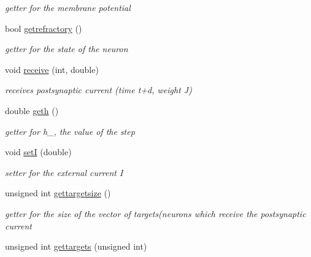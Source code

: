 \begin{DoxyCompactItemize}
\begin{DoxyCompactList}\small\item\em getter for the membrane potential \end{DoxyCompactList}\item 
\hypertarget{classNeuron_a0c78342d2e5c09893292550980a50e4d}{bool \hyperlink{classNeuron_a0c78342d2e5c09893292550980a50e4d}{getrefractory} ()}\label{classNeuron_a0c78342d2e5c09893292550980a50e4d}

\begin{DoxyCompactList}\small\item\em getter for the state of the neuron \end{DoxyCompactList}\item 
\hypertarget{classNeuron_a0f794db12711a961e7be31307e8940fd}{void \hyperlink{classNeuron_a0f794db12711a961e7be31307e8940fd}{receive} (int, double)}\label{classNeuron_a0f794db12711a961e7be31307e8940fd}

\begin{DoxyCompactList}\small\item\em receives postsynaptic current (time t+d, weight J) \end{DoxyCompactList}\item 
\hypertarget{classNeuron_ae4efea91b87896853c213f25bf22f3e1}{double \hyperlink{classNeuron_ae4efea91b87896853c213f25bf22f3e1}{geth} ()}\label{classNeuron_ae4efea91b87896853c213f25bf22f3e1}

\begin{DoxyCompactList}\small\item\em getter for h\-\_\-, the value of the step \end{DoxyCompactList}\item 
\hypertarget{classNeuron_a85d5cfb84ab11f4c59c1d594666c5c8a}{void \hyperlink{classNeuron_a85d5cfb84ab11f4c59c1d594666c5c8a}{set\-I} (double)}\label{classNeuron_a85d5cfb84ab11f4c59c1d594666c5c8a}

\begin{DoxyCompactList}\small\item\em setter for the external current I \end{DoxyCompactList}\item 
\hypertarget{classNeuron_aeaa2c4eb2ea550cea614c444a8568783}{unsigned int \hyperlink{classNeuron_aeaa2c4eb2ea550cea614c444a8568783}{gettargetsize} ()}\label{classNeuron_aeaa2c4eb2ea550cea614c444a8568783}

\begin{DoxyCompactList}\small\item\em getter for the size of the vector of targets(neurons which receive the postsynaptic current \end{DoxyCompactList}\item 
\hypertarget{classNeuron_a1fc9f687eebf3ec4c1df1432317d15c7}{unsigned int \hyperlink{classNeuron_a1fc9f687eebf3ec4c1df1432317d15c7}{gettargets} (unsigned int)}\label{classNeuron_a1fc9f687eebf3ec4c1df1432317d15c7}


\end{DoxyCompactItemize}
